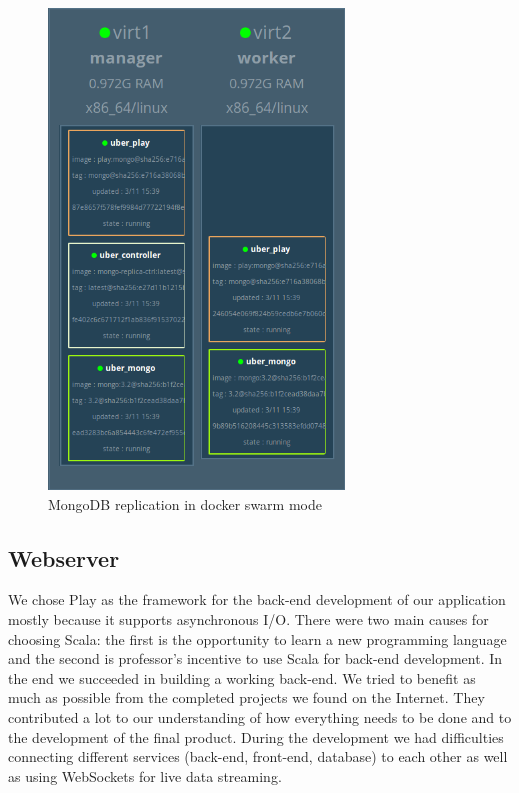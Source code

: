     \begin{figure}[H]
		\centering
		\includegraphics[width=0.7\textwidth]{images/backend.png}
		\caption{MongoDB replication in docker swarm mode}
		\label{backend}
	\end{figure}


\subsection{Webserver}
We chose Play as the framework for the back-end development of our application mostly because it supports asynchronous I/O. There were two main causes for choosing Scala: the first is the opportunity to learn a new programming language and the second is professor's incentive to use Scala for back-end development. In the end we succeeded in building a working back-end. We tried to benefit as much as possible from the completed projects we found on the Internet. They contributed a lot to our understanding of how everything needs to be done and to the development of the final product. During the development we had difficulties connecting different services (back-end, front-end, database) to each other as well as using WebSockets for live data streaming.

